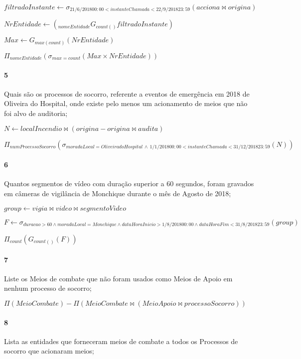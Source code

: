 \documentclass[12pt,a4paper]{article}
\begin{document}
$filtradoInstante \leftarrow \sigma_{21/6/2018 00:00 < instanteChamada < 22/9/2018 23:59} \left ( acciona \bowtie origina \right ) $

$NrEntidade \leftarrow\left ( _{nomeEntidade}G_{count()} filtradoInstante \right )$

$Max \leftarrow G_{max(count)} \left ( NrEntidade \right )$

$\Pi_{nomeEntidade}\left ( \sigma _{max=count}\left ( Max\times NrEntidade \right ) \right )$

\paragraph{5}
Quais são os processos de socorro, referente a eventos de emergência em 2018 de
Oliveira do Hospital, onde existe pelo menos um acionamento de meios que não foi alvo
de auditoria;

$N \leftarrow localIncendio \bowtie \left( origina - origina \bowtie audita \right)$

$\Pi_{numProcessoSocorro} \left( \sigma_{moradaLocal=Oliveira do Hospital \, \wedge \, 1/1/2018 00:00 < instanteChamada < 31/12/2018 23:59} \left(N\right)\right) $

\paragraph{6}
Quantos segmentos de vídeo com duração superior a 60 segundos, foram gravados em
câmeras de vigilância de Monchique durante o mês de Agosto de 2018;

$group \leftarrow vigia \bowtie video \bowtie segmentoVideo$

$F \leftarrow \sigma_{duracao > 60 \wedge moradaLocal = Monchique \wedge dataHoraInicio > 1/8/2018 00:00 \wedge dataHoraFim < 31/8/2018 23:59} \left( group\right) $

$\Pi_{count} \left(G_{count()} \left( F \right) \right) $

\paragraph{7}
Liste os Meios de combate que não foram usados como Meios de Apoio em nenhum
processo de socorro;

$\Pi \left( MeioCombate\right) - \Pi \left( MeioCombate \bowtie \left(MeioApoio \bowtie processoSocorro\right)\right) $

\paragraph{8}
Lista as entidades que forneceram meios de combate a todos os Processos de socorro
que acionaram meios;
\end{document}
